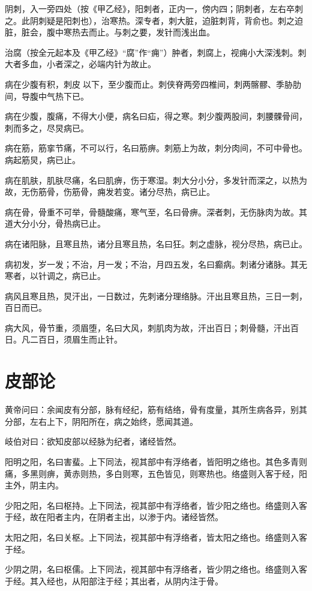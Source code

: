 \documentclass{article}%
\begin{document}
阴刺，入一旁四处（按《甲乙经》，阳刺者，正内一，傍内四；阴刺者，左右卒刺之。此阴刺疑是阳刺也），治寒热。深专者，刺大脏，迫脏刺背，背俞也。刺之迫脏，脏会，腹中寒热去而止。与刺之要，发针而浅出血。

治腐（按全元起本及《甲乙经》“腐”作“痈”）肿者，刺腐上，视痈小大深浅刺。刺大者多血，小者深之，必端内针为故止。

病在少腹有积，刺皮𩩻以下，至少腹而止。刺侠脊两旁四椎间，刺两髂髎、季胁肋间，导腹中气热下已。

病在少腹，腹痛，不得大小便，病名曰疝，得之寒。刺少腹两股间，刺腰髁骨间，刺而多之，尽炅病已。

病在筋，筋挛节痛，不可以行，名曰筋痹。刺筋上为故，刺分肉间，不可中骨也。病起筋炅，病已止。

病在肌肤，肌肤尽痛，名曰肌痹，伤于寒湿。刺大分小分，多发针而深之，以热为故，无伤筋骨，伤筋骨，痈发若变。诸分尽热，病已止。

病在骨，骨重不可举，骨髓酸痛，寒气至，名曰骨痹。深者刺，无伤脉肉为故。其道大分小分，骨热病已止。

病在诸阳脉，且寒且热，诸分且寒且热，名曰狂。刺之虚脉，视分尽热，病已止。

病初发，岁一发；不治，月一发；不治，月四五发，名曰癫病。刺诸分诸脉。其无寒者，以针调之，病已止。

病风且寒且热，炅汗出，一日数过，先刺诸分理络脉。汗出且寒且热，三日一刺，百日而已。

病大风，骨节重，须眉堕，名曰大风，刺肌肉为故，汗出百日；刺骨髓，汗出百日。凡二百日，须眉生而止针。
\section{皮部论}
黄帝问曰：余闻皮有分部，脉有经纪，筋有结络，骨有度量，其所生病各异，别其分部，左右上下，阴阳所在，病之始终，愿闻其道。

岐伯对曰：欲知皮部以经脉为纪者，诸经皆然。

阳明之阳，名曰害蜚。上下同法，视其部中有浮络者，皆阳明之络也。其色多青则痛，多黑则痹，黄赤则热，多白则寒，五色皆见，则寒热也。络盛则入客于经，阳主外，阴主内。

少阳之阳，名曰枢持。上下同法，视其部中有浮络者，皆少阳之络也。络盛则入客于经，故在阳者主内，在阴者主出，以渗于内。诸经皆然。

太阳之阳，名曰关枢。上下同法，视其部中有浮络者，皆太阳之络也。络盛则入客于经。

少阴之阴，名曰枢儒。上下同法，视其部中有浮络者，皆少阴之络也。络盛则入客于经。其入经也，从阳部注于经；其出者，从阴内注于骨。
\end{document}
